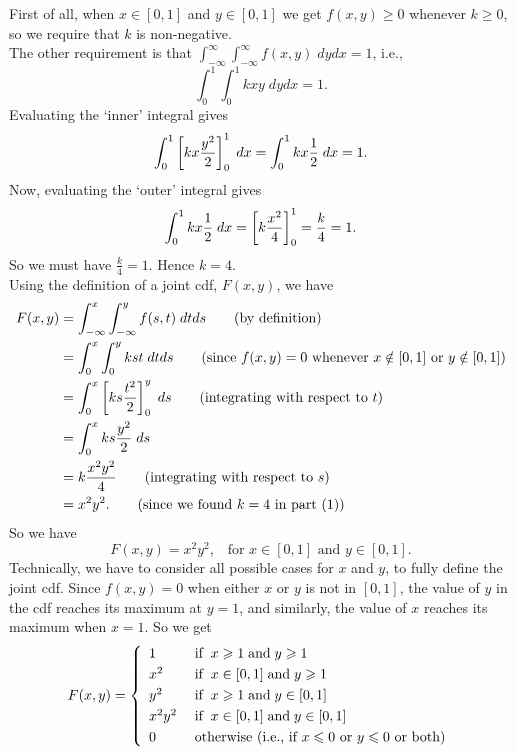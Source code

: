 \solution[to (1)]
First of all, when $x \in [0,1]$ and $y \in [0,1]$ we get $f(x,y) \geq 0$ whenever $k \geq 0$, so we require that $k$ is non-negative. \\

\noindent The other requirement is that $\int_{-\infty}^\infty \int_{-\infty}^\infty f(x,y) \; dy dx = 1$, i.e., 
\[
\int_{0}^1 \int_{0}^1 kxy \; dy dx = 1. \tag{since $f(x,y) = 0$ whenever $x \notin [0,1]$ or $y \notin [0,1]$}
\]
Evaluating the `inner' integral gives
\[
\int_{0}^1 \left[kx\frac{y^2}{2}\right]^1_{0} \; dx = \int_{0}^1 kx\frac{1}{2} \; dx = 1.
\]
Now, evaluating the `outer' integral gives
\[
\int_{0}^1 kx\frac{1}{2} \; dx = \left[k\frac{x^2}{4}\right]_0^1 = \frac{k}{4} = 1.
\]
So we must have $\frac{k}{4} = 1$. Hence $k = 4$. \\

\solution[to (2)]
Using the definition of a joint cdf, $F(x,y)$, we have
\begin{align*}
F(x,y) & = \int_{-\infty}^x \int_{-\infty}^y f(s,t) \; dtds \tag{by definition}  \\
	& = \int_{0}^x\int_0^y kst \; dtds \tag{since $f(x,y) = 0$ whenever $x \notin [0,1]$ or $y \notin [0,1]$} \\
	& = \int_0^x \left[ks\frac{t^2}{2}\right]_0^y \; ds \tag{integrating with respect to $t$} \\
	& = \int_0^x ks\frac{y^2}{2} \; ds \\
	& = k\frac{x^2y^2}{4} \tag{integrating with respect to $s$} \\
	& = x^2y^2. \tag{since we found $k = 4$ in part (1)}
\end{align*}
So we have
\[
F(x,y) = x^2y^2, \;\;\; \text{for $x \in [0,1]$ and $y \in [0,1].$}
\]
Technically, we have to consider all possible cases for $x$ and $y$, to fully define the joint cdf. Since $f(x,y) = 0$ when either $x$ or $y$ is not in $[0,1]$, the value of $y$ in the cdf reaches its maximum at $y = 1$, and similarly, the value of $x$ reaches its maximum when $x = 1$. So we get
\[
F(x,y) = \left\{ \begin{array}{ll}
1	& \;\text{if} \;\; x \geq 1 \; \text{and} \; y \geq 1  \smallskip \\
x^2	& \;\text{if} \;\; x \in [0,1] \; \text{and} \; y \geq 1  \smallskip \\
y^2	& \;\text{if} \;\;  x \geq 1 \; \text{and} \; y \in [0,1] \smallskip \\
x^2y^2 & \;\text{if} \;\;  x \in [0,1] \; \text{and} \; y \in [0,1] \smallskip \\
0	& \; \text{otherwise (i.e., if $x \leq 0$ or $y \leq 0$ or both)}
\end{array} \right.
\]
